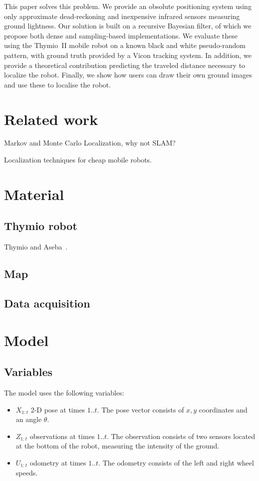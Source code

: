 \documentclass[letterpaper, 10pt, conference]{ieeeconf}
\begin{document}
This paper solves this problem.
We provide an obsolute positioning system using only approximate dead-reckoning and inexpensive infrared sensors measuring ground lightness.
Our solution is built on a recursive Bayesian filter, of which we propose both dense and sampling-based implementations.
We evaluate these using the Thymio~II mobile robot on a known black and white pseudo-random pattern, with ground truth provided by a Vicon tracking system.
In addition, we provide a theoretical contribution predicting the traveled distance necessary to localize the robot.
Finally, we show how users can draw their own ground images and use these to localise the robot.

\section{Related work}

Markov and Monte Carlo Localization, why not SLAM?

Localization techniques for cheap mobile robots.

\section{Material}

\subsection{Thymio robot}

Thymio and Aseba~\cite{magnenat2012arso, aseba2011tmech, riedo2013arso}.

\subsection{Map}

\subsection{Data acquisition}

\section{Model}

\subsection{Variables}

The model uses the following variables:
\begin{itemize}
\item $X_{1:t}$ 2-D pose at times $1..t$.
The pose vector consists of $x,y$ coordinates and an angle $\theta$.
\item $Z_{1:t}$ observations at times $1..t$.
The observation consists of two sensors located at the bottom of the robot, measuring the intensity of the ground.
\item $U_{1:t}$ odometry at times $1..t$.
The odometry consists of the left and right wheel speeds.
\end{itemize}
\end{document}
